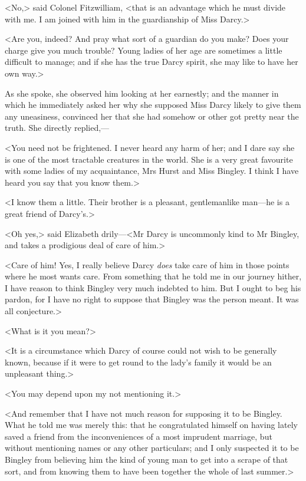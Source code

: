 <No,> said Colonel Fitzwilliam, <that is an advantage which he must divide with me. I am joined with him in the guardianship of Miss Darcy.>

<Are you, indeed? And pray what sort of a guardian do you make? Does your charge give you much trouble? Young ladies of her age are sometimes a little difficult to manage; and if she has the true Darcy spirit, she may like to have her own way.>

As she spoke, she observed him looking at her earnestly; and the manner in which he immediately asked her why she supposed Miss Darcy likely to give them any uneasiness, convinced her that she had somehow or other got pretty near the truth. She directly replied,—

<You need not be frightened. I never heard any harm of her; and I dare say she is one of the most tractable creatures in the world. She is a very great favourite with some ladies of my acquaintance, Mrs Hurst and Miss Bingley. I think I have heard you say that you know them.>

<I know them a little. Their brother is a pleasant, gentlemanlike man—he is a great friend of Darcy's.>

<Oh yes,> said Elizabeth drily—<Mr Darcy is uncommonly kind to Mr Bingley, and takes a prodigious deal of care of him.>

<Care of him! Yes, I really believe Darcy \textit{does} take care of him in those points where he most wants care. From something that he told me in our journey hither, I have reason to think Bingley very much indebted to him. But I ought to beg his pardon, for I have no right to suppose that Bingley was the person meant. It was all conjecture.>

<What is it you mean?>

<It is a circumstance which Darcy of course could not wish to be generally known, because if it were to get round to the lady's family it would be an unpleasant thing.>

<You may depend upon my not mentioning it.>

<And remember that I have not much reason for supposing it to be Bingley. What he told me was merely this: that he congratulated himself on having lately saved a friend from the inconveniences of a most imprudent marriage, but without mentioning names or any other particulars; and I only suspected it to be Bingley from believing him the kind of young man to get into a scrape of that sort, and from knowing them to have been together the whole of last summer.>


